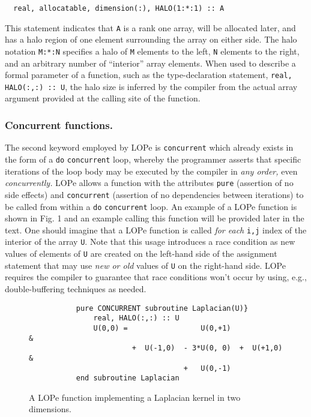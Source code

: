 \begin{verbatim}
  real, allocatable, dimension(:), HALO(1:*:1) :: A
\end{verbatim}
This statement indicates that \texttt{A} is a rank one array, will be
allocated later, and
has a halo region of one element surrounding the array on either side.
The halo notation \texttt{M:*:N} specifies a halo
of \texttt{M} elements to the left, \texttt{N} elements to the
right, and an arbitrary number of ``interior'' array elements.
When used to describe a formal parameter of a
function, such as the type-declaration statement, \texttt{real, HALO(:,:) :: U},
the halo size is inferred by the compiler
from the actual array argument provided at the
calling site of the function.


\subsubsection{Concurrent functions.}

The second keyword employed by LOPe is \texttt{concurrent} which already exists in the form of a
\texttt{do} \texttt{concurrent} loop, whereby the programmer asserts that specific
iterations of the loop body may be executed by the compiler in \emph{any order,} even
\emph{concurrently.}  LOPe allows a function with the attributes \texttt{pure} (assertion of no
side effects) and \texttt{concurrent} (assertion of no dependencies between iterations) to be
called from within a \texttt{do} \texttt{concurrent} loop.  An example of a LOPe function is
shown in Fig. 1 and an example calling this function will be provided later in the text.  One
should imagine that a LOPe function is called \emph{for each} \texttt{i,j} index of the interior of
the array \texttt{U}.  Note that this usage introduces a race condition as new values of
elements of \texttt{U} are created on the left-hand side of the assignment statement that may use
\emph{new or old} values of \texttt{U} on the right-hand side.  LOPe requires the compiler to
guarantee that race conditions won't occur by using, e.g., double-buffering techniques as needed.

\vspace{-.1in}

\begin{figure}
\begin{verbatim}
           pure CONCURRENT subroutine Laplacian(U)}
               real, HALO(:,:) :: U
               U(0,0) =                 U(0,+1)              &
                        +  U(-1,0)  - 3*U(0, 0)  +  U(+1,0)  &
                                    +   U(0,-1)
           end subroutine Laplacian
\end{verbatim}
\vspace{-.1in}
\caption{A LOPe function implementing a Laplacian kernel in two dimensions.}
\end{figure}


